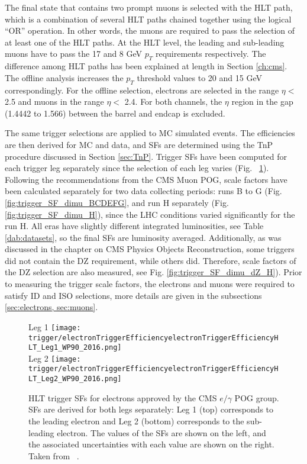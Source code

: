 The final state that contains two prompt muons is selected with the HLT path, which is a combination of several HLT paths chained together using the logical ``OR'' operation. In other words, the muons are required to pass the selection of at least one of the HLT paths. At the HLT level, the leading and sub-leading muons have to pass the 17 and 8 GeV $p_T$ requirements respectively. The difference among HLT paths has been explained at length in Section \ref{ch:cms}. The offline analysis increases the $p_T$ threshold values to 20 and 15 GeV correspondingly. For the offline selection, electrons are selected in the range $\eta < $ 2.5 and muons in the range $\eta < $ 2.4. For both channels, the $\eta$ region in the gap (1.4442 to 1.566) between the barrel and endcap is excluded.

The same trigger selections are applied to MC simulated events. The efficiencies are then derived for MC and data, and SFs are determined using the TnP procedure discussed in Section \ref{sec:TnP}. Trigger SFs have been computed for each trigger leg separately since the selection of each leg varies (Fig. ~\ref{fig:trigger_eff_diele}). Following the recommendations from the CMS Muon POG, scale factors have been calculated separately for two data collecting periods: runs B to G (Fig. \ref{fig:trigger_SF_dimu_BCDEFG}, and run H separately (Fig. \ref{fig:trigger_SF_dimu_H}), since the LHC conditions varied significantly for the run H. All eras have slightly different integrated luminosities, see Table \ref{dab:datasets}, so the final SFs are luminosity averaged. Additionally, as was discussed in the chapter on CMS Physics Objects Reconstruction, some triggers did not contain the DZ requirement, while others did. Therefore, scale factors of the DZ selection are also measured, see Fig. \ref{fig:trigger_SF_dimu_dZ_H}). Prior to measuring the trigger scale factors, the electrons and muons were required to satisfy ID and ISO selections, more details are given in the subsections \ref{sec:electrons, sec:muons}. 

\begin{figure}[H]
\centering
\subfloat Leg 1
{\texttt{[image: trigger/electronTriggerEfficiencyelectronTriggerEfficiencyHLT\_Leg1\_WP90\_2016.png]} } \\
\subfloat Leg 2
{\texttt{[image: trigger/electronTriggerEfficiencyelectronTriggerEfficiencyHLT\_Leg2\_WP90\_2016.png]} } \\
\caption[HLT trigger SFs for electrons.]{HLT trigger SFs for electrons approved by the CMS $e/ \gamma$ POG group. SFs are derived for both legs separately: Leg 1 (top) corresponds to the leading electron and Leg 2 (bottom) corresponds to the sub-leading electron. The values of the SFs are shown on the left, and the associated uncertainties with each value are shown on the right. Taken from ~\cite{vhbbAN}.}
\label{fig:trigger_eff_diele}
\end{figure}

